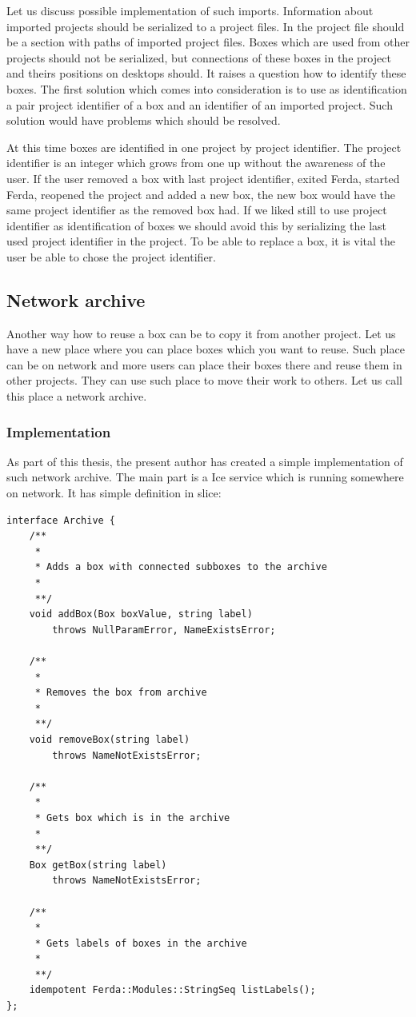 \documentclass[a4paper,12pt]{book}
\begin{document}
Let us discuss possible implementation of such imports. Information about imported projects should be serialized to a project files. In the project file should be a section with paths of imported project files. Boxes which are used from other projects should not be serialized, but connections of these boxes in the project and theirs positions on desktops should. It raises a question how to identify these boxes. The first solution which comes into consideration is to use as identification a pair project identifier of a box and an identifier of an imported project. Such solution would have problems which should be resolved.

At this time boxes are identified in one project by project identifier. The project identifier is an integer which grows from one up without the awareness of the user. If the user removed a box with last project identifier, exited Ferda, started Ferda, reopened the project and added a new box, the new box would have the same project identifier as the removed box had. If we liked still to use project identifier as identification of boxes we should avoid this by serializing the last used project identifier in the project. To be able to replace a box, it is vital the user be able to chose the project identifier.

\subsection{Network archive}
Another way how to reuse a box can be to copy it from another project. Let us have a new place where you can place boxes which you want to reuse. Such place can be on network and more users can place their boxes there and reuse them in other projects. They can use such place to move their work to others. Let us call this place a network archive.

\subsubsection{Implementation}
As part of this thesis, the present author has created a simple implementation of such network archive. The main part is a Ice service which is running somewhere on network. It has simple definition in slice:
\begin{verbatim}
interface Archive {
	/**
	 *
	 * Adds a box with connected subboxes to the archive
	 *
	 **/
	void addBox(Box boxValue, string label)
		throws NullParamError, NameExistsError;

	/**
	 *
	 * Removes the box from archive
	 *
	 **/
	void removeBox(string label)
		throws NameNotExistsError;

	/**
	 *
	 * Gets box which is in the archive
	 *
	 **/
	Box getBox(string label)
		throws NameNotExistsError;

	/**
	 *
	 * Gets labels of boxes in the archive
	 *
	 **/
	idempotent Ferda::Modules::StringSeq listLabels();
};
\end{verbatim}
\end{document}
